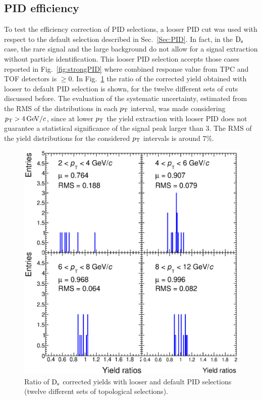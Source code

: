 \subsection{PID efficiency}
To test the efficiency correction of PID selections, a looser PID cut
was used with respect to the default selection described in Sec.~\ref{Sec:PID}. 
In fact, in the ${\rm D_s}$ case, the rare signal and the large background 
do not allow for a signal extraction without 
particle identification. This looser PID selection accepts those cases 
reported in Fig.~\ref{fig:strongPID} where combined response value from TPC and TOF 
detectors is $\geqslant 0$.
In Fig.~\ref{fig:rmsPID} the ratio
of the corrected yield obtained with looser to default PID selection is shown, 
for the twelve different sets of cuts discussed before.
The evaluation of the systematic uncertainty, estimated from the RMS of the distributions in each $p_{\rm T}$ 
interval, was made considering $p_{\rm T} > 4 \, \mathrm{GeV}/c$, since at lower $p_{\rm T}$ 
the yield extraction with looser PID does not guarantee a statistical significance
of the signal peak larger than 3. The RMS of the yield distributions for the considered
$p_{\rm T}$ intervals is around 7\%.

\begin{figure}[!htb]
\begin{center}
 \includegraphics[width=.7\textwidth]{FigCap4/PIDrms4x4}
\caption{Ratio of ${\rm D_s}$ corrected yields with looser and default PID selections (twelve different sets of
topological selections).}
\label{fig:rmsPID}
\end{center}
\end{figure}

